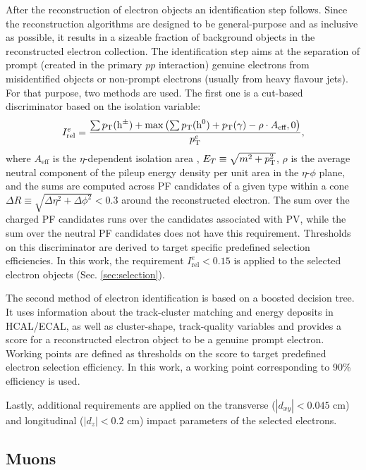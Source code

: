 After the reconstruction of electron objects an identification step follows. Since the reconstruction algorithms are designed to be general-purpose and as inclusive as possible, it results in a sizeable fraction of background objects in the reconstructed electron collection. The identification step aims at the separation of prompt (created in the primary $pp$ interaction) genuine electrons from misidentified objects or non-prompt electrons (usually from heavy flavour jets). For that purpose, two methods are used. The first one is a cut-based discriminator based on the isolation variable:
\begin{equation}\label{eq:iso_e}
    I^e_{\text{rel}} = \dfrac{\sum p_{\text{T}}(\text{h}^\pm) + \max\left(\sum p_{\text{T}}(\text{h}^0) + p_{\text{T}}(\gamma) - \rho \cdot A_\text{eff}, 0\right)}{p_{\text{T}}^e},
\end{equation}
where $A_\text{eff}$ is the $\eta$-dependent isolation area \cite{CMS:2015xaf}, $E_T \equiv \sqrt{m^2 + p_{\text{T}}^2}$, $\rho$ is the average neutral component of the pileup energy density per unit area in the $\eta$-$\phi$ plane, and the sums are computed across PF candidates of a given type within a cone $\Delta R \equiv \sqrt{\Delta\eta^2+\Delta\phi^2}< 0.3$ around the reconstructed electron. The sum over the charged PF candidates runs over the candidates associated with PV, while the sum over the neutral PF candidates does not have this requirement. Thresholds on this discriminator are derived to target specific predefined selection efficiencies. In this work, the requirement $I^e_{\text{rel}} < 0.15$ is applied to the selected electron objects (Sec. \ref{sec:selection}). 

The second method of electron identification is based on a boosted decision tree. It uses information about the track-cluster matching and energy deposits in HCAL/ECAL, as well as cluster-shape, track-quality variables and provides a score for a reconstructed electron object to be a genuine prompt electron. Working points are defined as thresholds on the score to target predefined electron selection efficiency. In this work, a working point corresponding to 90\% efficiency is used.

Lastly, additional requirements are applied on the transverse ($|d_{xy}| < 0.045$ cm) and longitudinal ($|d_z| < 0.2$ cm) impact parameters of the selected electrons.

\subsection{Muons}\label{sec:reco_mu}

